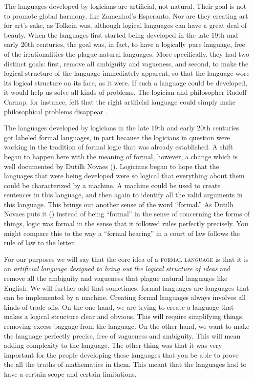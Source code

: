 The languages developed by logicians are artificial, not natural. Their goal is not to promote global harmony, like Zamenhof's Esperanto. Nor are they creating art for art's sake, as Tolkein was, although logical languages can have a great deal of beauty. When the languages first started being developed in the late 19th and early 20th centuries, the goal was, in fact, to have a logically pure language, free of the irrationalities the plague natural languages. More specifically, they had two distinct goals: first, remove all ambiguity and vagueness, and second, to make the logical structure of the language immediately apparent, so that the language wore its logical structure on its face, as it were. If such a language could be developed, it would help us solve all kinds of problems. The logician and philosopher Rudolf Carnap, for instance, felt that the right artificial language could simply make philosophical problems disappear \citep{Carnap1928}.

The languages developed by logicians in the late 19th and early 20th centuries got labeled formal languages, in part because the logicians in question were working in the tradition of formal logic that was already established. A shift began to happen here with the meaning of formal, however, a change which is well documented by Dutilh Novaes  (\cite{DutilhNovaes2011}). Logicians began to hope that the languages that were being developed were so logical that everything about them could be characterized by a machine. A machine could be used to create sentences in this language, and then again to identify all the valid arguments in this language. This brings out another sense of the word ``formal.'' As Dutilh Novaes puts it (\cite{DutilhNovaes2011}) instead of being ``formal'' in the sense of concerning the forms of things, logic was formal in the sense that it followed rules perfectly precisely. You might compare this to the way a ``formal hearing'' in a court of law follows the rule of law to the letter.

For our purposes we will say that the core idea of a  \textsc{\gls{formal language}} \label{def:formal_language} is that it is an \emph{artificial language designed to bring out the logical structure of ideas} and remove all the ambiguity and vagueness that plague natural languages like English. We will further add that sometimes, formal languages are languages that can be implemented by a machine. Creating formal languages always involves all kinds of trade offs. On the one hand, we are trying to create a language that makes a logical structure clear and obvious. This will require simplifying things, removing excess baggage from the language. On the other hand, we want to make the language perfectly precise, free of vagueness and ambiguity. This will mean adding complexity to the language. The other thing was that it was very important for the people developing these languages that you be able to prove the all the truths of mathematics in them. This meant that the languages had to have a certain scope and certain limitations.

